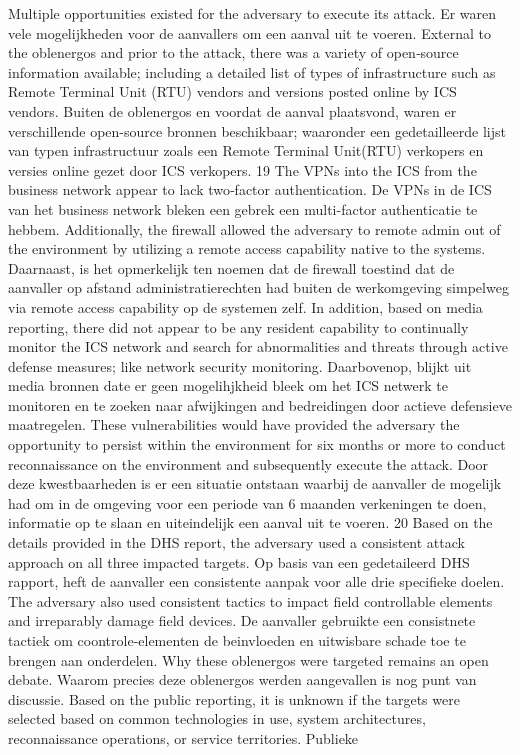 		Multiple opportunities existed for the adversary to execute its attack. Er waren vele mogelijkheden
		voor de aanvallers om een aanval uit te voeren.
		External to the oblenergos and prior to the attack, there was a variety of open‐source information
		available; including a detailed list of types of infrastructure such as Remote Terminal Unit (RTU)
		vendors and versions posted online by ICS vendors. Buiten de oblenergos en voordat de aanval
		plaatsvond, waren er verschillende open-source bronnen beschikbaar; waaronder een gedetailleerde
		lijst van typen infrastructuur zoals een Remote Terminal Unit(RTU) verkopers en versies online gezet
		door ICS verkopers.
		19 The VPNs into the ICS from the business network appear to lack two‐factor authentication. De
		VPNs in de ICS van het business network bleken een gebrek een multi-factor authenticatie te
		hebbem.
		Additionally, the firewall allowed the adversary to remote admin out of the environment by utilizing
		a remote access capability native to the systems. Daarnaast, is het opmerkelijk ten noemen dat de
		firewall toestind dat de aanvaller op afstand administratierechten had buiten de werkomgeving
		simpelweg via remote access capability op de systemen zelf.
		In addition, based on media reporting, there did not appear to be any resident capability to
		continually monitor the ICS network and search for abnormalities and threats through active defense
		measures; like network security monitoring. Daarbovenop, blijkt uit media bronnen date er geen
		mogelihjkheid bleek om het ICS netwerk te monitoren en te zoeken naar afwijkingen and
		bedreidingen door actieve defensieve maatregelen.
		These vulnerabilities would have provided the adversary the opportunity to persist within the
		environment for six months or more to conduct reconnaissance on the environment and
		subsequently execute the attack. Door deze kwestbaarheden is er een situatie ontstaan waarbij de
		aanvaller de mogelijk had om in de omgeving voor een periode van 6 maanden verkeningen te doen,
		informatie op te slaan en uiteindelijk een aanval uit te voeren.
		20 Based on the details provided in the DHS report, the adversary used a consistent attack approach
		on all three impacted targets. Op basis van een gedetaileerd DHS rapport, heft de aanvaller een
		consistente aanpak voor alle drie specifieke doelen.
		The adversary also used consistent tactics to impact field controllable elements and irreparably
		damage field devices. De aanvaller gebruikte een consistnete tactiek om coontrole-elementen de
		beinvloeden en uitwisbare schade toe te brengen aan onderdelen.
		Why these oblenergos were targeted remains an open debate. Waarom precies deze oblenergos
		werden aangevallen is nog punt van discussie.
		Based on the public reporting, it is unknown if the targets were selected based on common
		technologies in use, system architectures, reconnaissance operations, or service territories. Publieke
		
